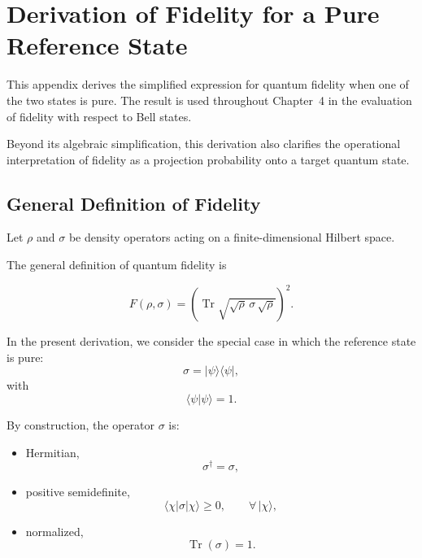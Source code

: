 
\chapter{Derivation of Fidelity for a Pure Reference State}
\label{app:fidelity_pure_reference_state}

This appendix derives the simplified expression for quantum fidelity when one of the two states is pure. The result is used throughout Chapter~4 in the evaluation of fidelity with respect to Bell states.

\medskip

Beyond its algebraic simplification, this derivation also clarifies the operational interpretation of fidelity as a projection probability onto a target quantum state.


\section*{General Definition of Fidelity}

Let \( \rho \) and \( \sigma \) be density operators acting on a finite-dimensional Hilbert space.

The general definition of quantum fidelity is

\begin{equation}
F(\rho,\sigma)
=
\left(
\operatorname{Tr}
\sqrt{
\sqrt{\rho}\,
\sigma\,
\sqrt{\rho}
}
\right)^2.
\label{eq:general_fidelity_definition}
\end{equation}

In the present derivation, we consider the special case in which the reference state is pure:
\begin{equation}
\sigma
=
|\psi\rangle\langle\psi|,
\label{eq:pure_reference_density_operator}
\end{equation}
with
\begin{equation}
\langle \psi | \psi \rangle = 1.
\label{eq:pure_state_normalization}
\end{equation}

By construction, the operator \( \sigma \) is:

\begin{itemize}
    \item Hermitian,
    \[
    \sigma^\dagger = \sigma,
    \]

    \item positive semidefinite,
    \[
    \langle \chi | \sigma | \chi \rangle \ge 0,
    \qquad
    \forall\,|\chi\rangle,
    \]

    \item normalized,
    \[
    \operatorname{Tr}(\sigma)=1.
    \]
\end{itemize}

